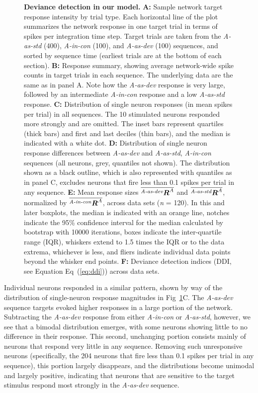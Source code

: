 \documentclass[10pt,letterpaper]{article}
\newcommand{\dev}{\textit{A-as-dev}}
\newcommand{\msc}{\textit{A-in-con}}
\newcommand{\std}{\textit{A-as-std}}
\newcommand{\ifstringequal}[4]{%
  \ifnum\pdfstrcmp{#1}{#2}=0
  #3%
  \else
  #4%
  \fi
}
\newcommand{\seqreplace}[1]{\ifstringequal{dev}{#1}{\dev}{%
    \ifstringequal{std}{#1}{\std}{%
        \ifstringequal{msc}{#1}{\msc}{#1}%
    }%
}}
\newcommand{\R}[3][]{{}^{\seqreplace{#1}}_{}\boldsymbol R^{#2}_{#3}}
\newcommand{\mean}[1]{\overline{#1}}
\newcommand{\FIG}[1]{Fig~\ref{fig:#1}}
\newcommand{\EQ}[1]{Eq~(\ref{eq:#1})}
\newcommand{\statistic}[2]{\textit{#1} = \num{#2}}
\begin{document}
\begin{figure}[!h]
    \caption{%
        \textbf{Deviance detection in our model.}
        \textbf{A:} Sample network target response intensity by trial type. Each horizontal line of the plot summarizes the network response in one target trial in terms of spikes per integration time step. Target trials are taken from the \std{} (400), \msc{} (100), and \dev{} (100) sequences, and sorted by sequence time (earliest trials are at the bottom of each section).
        \textbf{B:} Response summary, showing average network-wide spike counts in target trials in each sequence. The underlying data are the same as in panel A. Note how the \dev{} response is very large, followed by an intermediate \msc{} response and a low \std{} response.
        \textbf{C:} Distribution of single neuron responses (in mean spikes per trial) in all sequences. The 10 stimulated neurons responded more strongly and are omitted. The inset bars represent quartiles (thick bars) and first and last deciles (thin bars), and the median is indicated with a white dot.
        \textbf{D:} Distribution of single neuron response differences between \dev{} and \std{}, \msc{} sequences (all neurons, grey, quantiles not shown). The distribution shown as a black outline, which is also represented with quantiles as in panel C, excludes neurons that fire less than 0.1 spikes per trial in any sequence.
        \textbf{E:} Mean response sizes $\mean{\R[dev]{A}{}}$ and $\mean{\R[std]{A}{}}$, normalized by $\mean{\R[msc]{A}{}}$, across data sets (\statistic{n}{120}). In this and later boxplots, the median is indicated with an orange line, notches indicate the 95\% confidence interval for the median calculated by bootstrap with 10000 iterations, boxes indicate the inter-quartile range (IQR), whiskers extend to 1.5 times the IQR or to the data extrema, whichever is less, and fliers indicate individual data points beyond the whisker end points.
        \textbf{F:} Deviance detection indices (DDI, see Equation \EQ{ddi}) across data sets.
    }
    \label{fig:2}
\end{figure}

Individual neurons responded in a similar pattern, shown by way of the distribution of single-neuron response magnitudes in \FIG{2}C. The \dev{} sequence targets evoked higher responses in a large portion of the network. Subtracting the \dev{} response from either \msc{} or \std{}, however, we see that a bimodal distribution emerges, with some neurons showing little to no difference in their response. This second, unchanging portion consists mainly of neurons that respond very little in any sequence. Removing such unresponsive neurons (specifically, the 204 neurons that fire less than 0.1 spikes per trial in any sequence), this portion largely disappears, and the distributions become unimodal and largely positive, indicating that neurons that are sensitive to the target stimulus respond most strongly in the \dev{} sequence.
\end{document}
